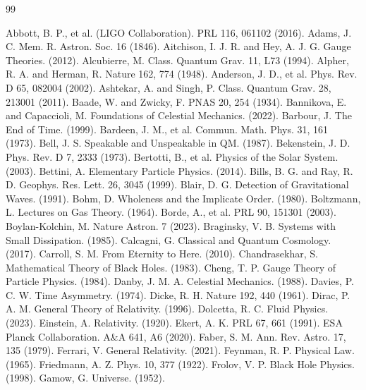 \documentclass[12pt,a4paper]{article}
\begin{document}
\begin{thebibliography}{99}
\begin{singlespace}
 Abbott, B. P., et al. (LIGO Collaboration). PRL 116, 061102 (2016).
 Adams, J. C. Mem. R. Astron. Soc. 16 (1846).
 Aitchison, I. J. R. and Hey, A. J. G. Gauge Theories. (2012).
 Alcubierre, M. Class. Quantum Grav. 11, L73 (1994).
 Alpher, R. A. and Herman, R. Nature 162, 774 (1948).
 Anderson, J. D., et al. Phys. Rev. D 65, 082004 (2002).
 Ashtekar, A. and Singh, P. Class. Quantum Grav. 28, 213001 (2011).
 Baade, W. and Zwicky, F. PNAS 20, 254 (1934).
 Bannikova, E. and Capaccioli, M. Foundations of Celestial Mechanics. (2022).
 Barbour, J. The End of Time. (1999).
 Bardeen, J. M., et al. Commun. Math. Phys. 31, 161 (1973).
 Bell, J. S. Speakable and Unspeakable in QM. (1987).
 Bekenstein, J. D. Phys. Rev. D 7, 2333 (1973).
 Bertotti, B., et al. Physics of the Solar System. (2003).
 Bettini, A. Elementary Particle Physics. (2014).
 Bills, B. G. and Ray, R. D. Geophys. Res. Lett. 26, 3045 (1999).
 Blair, D. G. Detection of Gravitational Waves. (1991).
 Bohm, D. Wholeness and the Implicate Order. (1980).
 Boltzmann, L. Lectures on Gas Theory. (1964).
 Borde, A., et al. PRL 90, 151301 (2003).
 Boylan-Kolchin, M. Nature Astron. 7 (2023).
 Braginsky, V. B. Systems with Small Dissipation. (1985).
 Calcagni, G. Classical and Quantum Cosmology. (2017).
 Carroll, S. M. From Eternity to Here. (2010).
 Chandrasekhar, S. Mathematical Theory of Black Holes. (1983).
 Cheng, T. P. Gauge Theory of Particle Physics. (1984).
 Danby, J. M. A. Celestial Mechanics. (1988).
 Davies, P. C. W. Time Asymmetry. (1974).
 Dicke, R. H. Nature 192, 440 (1961).
 Dirac, P. A. M. General Theory of Relativity. (1996).
 Dolcetta, R. C. Fluid Physics. (2023).
 Einstein, A. Relativity. (1920).
 Ekert, A. K. PRL 67, 661 (1991).
 ESA Planck Collaboration. A\&A 641, A6 (2020).
 Faber, S. M. Ann. Rev. Astro. 17, 135 (1979).
 Ferrari, V. General Relativity. (2021).
 Feynman, R. P. Physical Law. (1965).
 Friedmann, A. Z. Phys. 10, 377 (1922).
 Frolov, V. P. Black Hole Physics. (1998).
 Gamow, G. Universe. (1952).

\end{singlespace}
\end{thebibliography}
\end{document}
